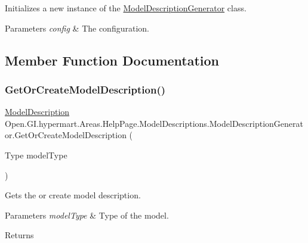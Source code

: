 Initializes a new instance of the \hyperlink{class_open_1_1_g_i_1_1hypermart_1_1_areas_1_1_help_page_1_1_model_descriptions_1_1_model_description_generator}{Model\+Description\+Generator} class. 


\begin{DoxyParams}{Parameters}
{\em config} & The configuration.\\
\hline
\end{DoxyParams}


\subsection{Member Function Documentation}
\hypertarget{class_open_1_1_g_i_1_1hypermart_1_1_areas_1_1_help_page_1_1_model_descriptions_1_1_model_description_generator_aa693e668d64aa73688aaa4fc080eb525}{}\label{class_open_1_1_g_i_1_1hypermart_1_1_areas_1_1_help_page_1_1_model_descriptions_1_1_model_description_generator_aa693e668d64aa73688aaa4fc080eb525} 
\subsubsection{\texorpdfstring{Get\+Or\+Create\+Model\+Description()}{GetOrCreateModelDescription()}}
{\footnotesize\ttfamily \hyperlink{class_open_1_1_g_i_1_1hypermart_1_1_areas_1_1_help_page_1_1_model_descriptions_1_1_model_description}{Model\+Description} Open.\+G\+I.\+hypermart.\+Areas.\+Help\+Page.\+Model\+Descriptions.\+Model\+Description\+Generator.\+Get\+Or\+Create\+Model\+Description (\begin{DoxyParamCaption}\item[{Type}]{model\+Type }\end{DoxyParamCaption})}



Gets the or create model description. 


\begin{DoxyParams}{Parameters}
{\em model\+Type} & Type of the model.\\
\hline
\end{DoxyParams}
\begin{DoxyReturn}{Returns}

\end{DoxyReturn}


